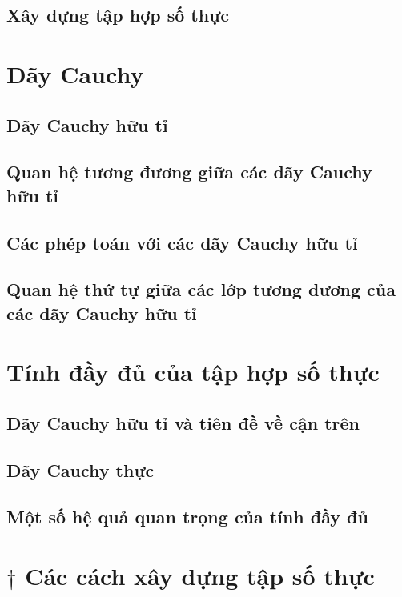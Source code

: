 \subsection{Xây dựng tập hợp số thực}

\section{Dãy Cauchy}

\subsection{Dãy Cauchy hữu tỉ}

\subsection{Quan hệ tương đương giữa các dãy Cauchy hữu tỉ}

\subsection{Các phép toán với các dãy Cauchy hữu tỉ}

\subsection{Quan hệ thứ tự giữa các lớp tương đương của các dãy Cauchy hữu tỉ}

\section{Tính đầy đủ của tập hợp số thực}

\subsection{Dãy Cauchy hữu tỉ và tiên đề về cận trên}

\subsection{Dãy Cauchy thực}

\subsection{Một số hệ quả quan trọng của tính đầy đủ}

\section{$\dagger$ Các cách xây dựng tập số thực}

